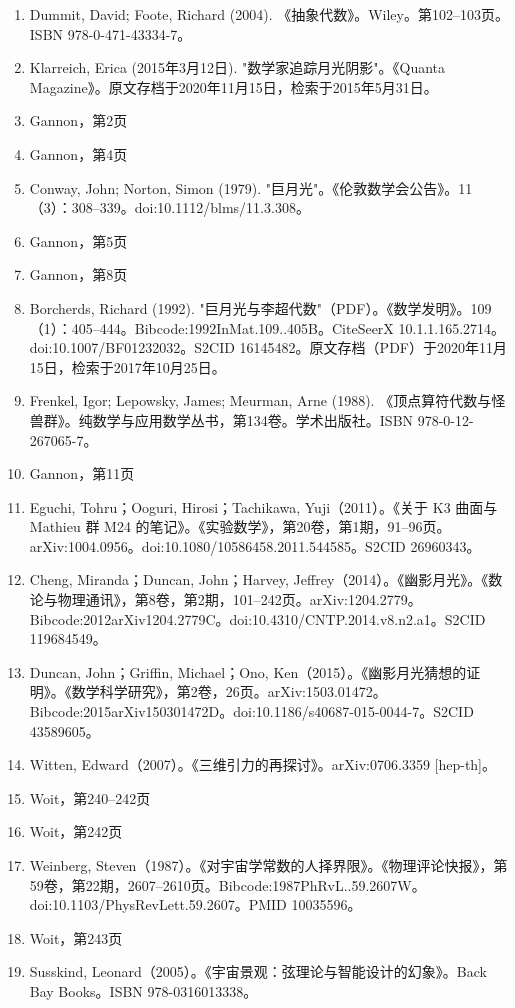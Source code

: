 \begin{enumerate}
\item Dummit, David; Foote, Richard (2004). 《抽象代数》。Wiley。第102–103页。ISBN 978-0-471-43334-7。  
\item Klarreich, Erica (2015年3月12日). "数学家追踪月光阴影"。《Quanta Magazine》。原文存档于2020年11月15日，检索于2015年5月31日。  
\item Gannon，第2页  
\item Gannon，第4页  
\item Conway, John; Norton, Simon (1979). "巨月光"。《伦敦数学会公告》。11（3）：308–339。doi:10.1112/blms/11.3.308。  
\item Gannon，第5页  
\item Gannon，第8页  
\item Borcherds, Richard (1992). "巨月光与李超代数"（PDF）。《数学发明》。109（1）：405–444。Bibcode:1992InMat.109..405B。CiteSeerX 10.1.1.165.2714。doi:10.1007/BF01232032。S2CID 16145482。原文存档（PDF）于2020年11月15日，检索于2017年10月25日。  
\item Frenkel, Igor; Lepowsky, James; Meurman, Arne (1988). 《顶点算符代数与怪兽群》。纯数学与应用数学丛书，第134卷。学术出版社。ISBN 978-0-12-267065-7。
\item Gannon，第11页  
\item Eguchi, Tohru；Ooguri, Hirosi；Tachikawa, Yuji（2011）。《关于 K3 曲面与 Mathieu 群 M24 的笔记》。《实验数学》，第20卷，第1期，91–96页。arXiv:1004.0956。doi:10.1080/10586458.2011.544585。S2CID 26960343。  
\item Cheng, Miranda；Duncan, John；Harvey, Jeffrey（2014）。《幽影月光》。《数论与物理通讯》，第8卷，第2期，101–242页。arXiv:1204.2779。Bibcode:2012arXiv1204.2779C。doi:10.4310/CNTP.2014.v8.n2.a1。S2CID 119684549。  
\item Duncan, John；Griffin, Michael；Ono, Ken（2015）。《幽影月光猜想的证明》。《数学科学研究》，第2卷，26页。arXiv:1503.01472。Bibcode:2015arXiv150301472D。doi:10.1186/s40687-015-0044-7。S2CID 43589605。  
\item Witten, Edward（2007）。《三维引力的再探讨》。arXiv:0706.3359 [hep-th]。  
\item Woit，第240–242页  
\item Woit，第242页  
\item Weinberg, Steven（1987）。《对宇宙学常数的人择界限》。《物理评论快报》，第59卷，第22期，2607–2610页。Bibcode:1987PhRvL..59.2607W。doi:10.1103/PhysRevLett.59.2607。PMID 10035596。
\item Woit，第243页  
\item Susskind, Leonard（2005）。《宇宙景观：弦理论与智能设计的幻象》。Back Bay Books。ISBN 978-0316013338。  

\end{enumerate}
